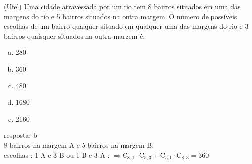 \begin{ex}
	(Ufel) Uma cidade atravessada por um rio tem 8 bairros situados em uma das margens do rio e 5 bairros situados na outra margem. O número de possíveis escolhas de um bairro qualquer situado em qualquer uma das margens do rio e 3 bairros quaisquer situados na outra margem é:
    \begin{enumerate}[(a)]
    \item 280
    \item 360
    \item 480
    \item 1680
    \item 2160
    \end{enumerate}
      \begin{sol}
       resposta: b \\
       8 bairros na margem A e 5 bairros na margem B.  \\
       escolhas : 1 A e 3 B ou 1 B e 3 A : $\Longrightarrow\mathrm{C}_{8,1}\cdot\mathrm{C}_{5,3} + \mathrm{C}_{5,1}\cdot\mathrm{C}_{8,3}=360$
      \end{sol}
\end{ex}